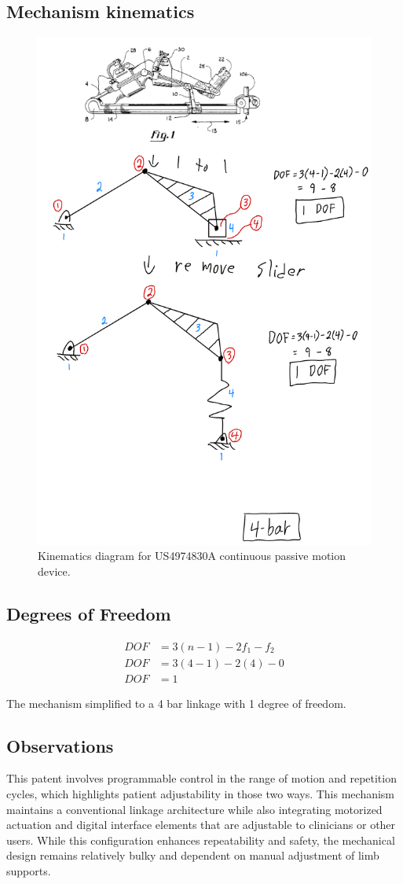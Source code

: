 \documentclass[11pt]{article}
\begin{document}
\subsection{Mechanism kinematics}
\begin{figure}[H]
  \centering
  \includegraphics[width=0.54\linewidth]{../Kinematic Mechanism Images/4974830.png}
  \caption{Kinematics diagram for US4974830A continuous passive motion device.}
  \label{fig:US4974830A_kinematics}
\end{figure}

\subsection{Degrees of Freedom}
\[
\begin{aligned}
DOF &= 3(n-1) - 2f_1 - f_2 \\
DOF &= 3(4-1) - 2(4) - 0 \\
DOF &= 1
\end{aligned}
\]

The mechanism simplified to a 4 bar linkage with 1 degree of freedom.

\subsection{Observations}
This patent involves programmable control in the range of motion and repetition cycles, which highlights patient adjustability in those two ways. This mechanism maintains a conventional linkage architecture while also integrating motorized actuation and digital interface elements that are adjustable to clinicians or other users. While this configuration enhances repeatability and safety, the mechanical design remains relatively bulky and dependent on manual adjustment of limb supports.
\end{document}

